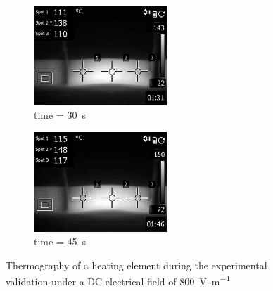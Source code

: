 \documentclass[11pt,review,times]{elsarticle}
\begin{document}
\begin{figure}[htb]
\begin{subfigure}{55mm}
	\end{subfigure}
	\begin{subfigure}{55mm}
		\center
		\captionsetup{width=50mm}
		\includegraphics[width=50mm]{t_30.png}
		\caption{time = \SI{30}{\s}}
	\end{subfigure}
	\begin{subfigure}{55mm}
		\center
		\captionsetup{width=50mm}
		\includegraphics[width=50mm]{t_45.png}
		\caption{time = \SI{45}{\s}}
	\end{subfigure}
	\caption{Thermography of a heating element during the experimental validation under a DC electrical field of \SI{800}{\volt\per\metre} \cite{Brassard2018_figshare_article1}}
	\label{fig:results_lab}
\end{figure}
\end{document}
